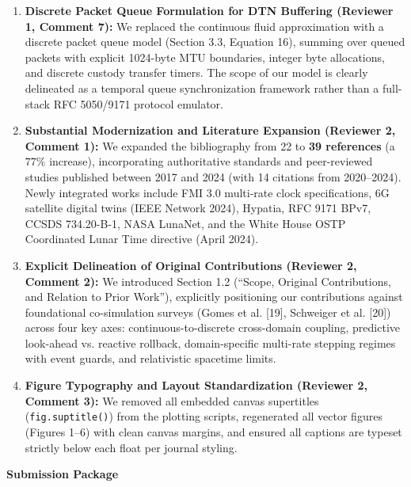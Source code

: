 \documentclass[10pt]{article}
\begin{document}
\begin{enumerate}[leftmargin=1.8em, itemsep=2.5pt, topsep=1pt, parsep=0pt]
  \item \textbf{Discrete Packet Queue Formulation for DTN Buffering (Reviewer 1, Comment 7):}
  We replaced the continuous fluid approximation with a discrete packet queue model (Section 3.3, Equation 16), summing over queued packets with explicit 1024-byte MTU boundaries, integer byte allocations, and discrete custody transfer timers. The scope of our model is clearly delineated as a temporal queue synchronization framework rather than a full-stack RFC 5050/9171 protocol emulator.

  \item \textbf{Substantial Modernization and Literature Expansion (Reviewer 2, Comment 1):}
  We expanded the bibliography from 22 to \textbf{39 references} (a $77\%$ increase), incorporating authoritative standards and peer-reviewed studies published between 2017 and 2024 (with 14 citations from 2020--2024). Newly integrated works include FMI 3.0 multi-rate clock specifications, 6G satellite digital twins (IEEE Network 2024), Hypatia, RFC 9171 BPv7, CCSDS 734.20-B-1, NASA LunaNet, and the White House OSTP Coordinated Lunar Time directive (April 2024).

  \item \textbf{Explicit Delineation of Original Contributions (Reviewer 2, Comment 2):}
  We introduced Section 1.2 (``Scope, Original Contributions, and Relation to Prior Work''), explicitly positioning our contributions against foundational co-simulation surveys (Gomes et al. [19], Schweiger et al. [20]) across four key axes: continuous-to-discrete cross-domain coupling, predictive look-ahead vs. reactive rollback, domain-specific multi-rate stepping regimes with event guards, and relativistic spacetime limits.

  \item \textbf{Figure Typography and Layout Standardization (Reviewer 2, Comment 3):}
  We removed all embedded canvas supertitles (\texttt{fig.suptitle()}) from the plotting scripts, regenerated all vector figures (Figures 1--6) with clean canvas margins, and ensured all captions are typeset strictly below each float per journal styling.
\end{enumerate}

\vspace{0.1cm}
\noindent
\textbf{\large Submission Package}
\vspace{0.05cm}
\end{document}
